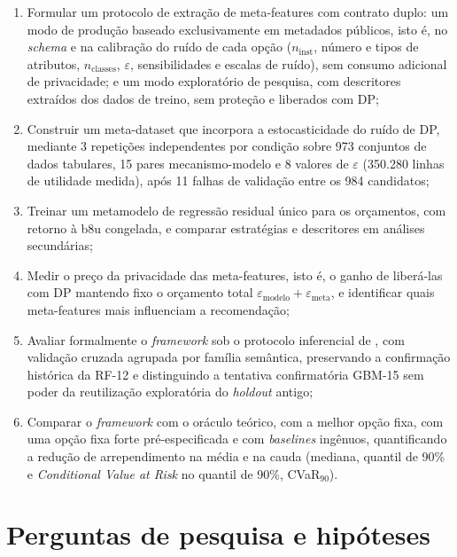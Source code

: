 \begin{enumerate}[label=\alph*)]
    \item Formular um protocolo de extração de meta-features com contrato duplo: um modo de produção baseado exclusivamente em metadados públicos, isto é, no \textit{schema} e na calibração do ruído de cada opção ($n_{\text{inst}}$, número e tipos de atributos, $n_{\text{classes}}$, $\varepsilon$, sensibilidades e escalas de ruído), sem consumo adicional de privacidade; e um modo exploratório de pesquisa, com descritores extraídos dos dados de treino, sem proteção e liberados com DP;
    \item Construir um meta-dataset que incorpora a estocasticidade do ruído de DP, mediante 3 repetições independentes por condição sobre 973 conjuntos de dados tabulares, 15 pares mecanismo-modelo e 8 valores de $\varepsilon$ (350.280 linhas de utilidade medida), após 11 falhas de validação entre os 984 candidatos;
    \item Treinar um metamodelo de regressão residual único para os orçamentos, com retorno à b8u congelada, e comparar estratégias e descritores em análises secundárias;
    \item Medir o preço da privacidade das meta-features, isto é, o ganho de liberá-las com DP mantendo fixo o orçamento total $\varepsilon_{\text{modelo}} + \varepsilon_{\text{meta}}$, e identificar quais meta-features mais influenciam a recomendação;
    \item Avaliar formalmente o \textit{framework} sob o protocolo inferencial de , com validação cruzada agrupada por família semântica, preservando a confirmação histórica da RF-12 e distinguindo a tentativa confirmatória GBM-15 sem poder da reutilização exploratória do \textit{holdout} antigo;
    \item Comparar o \textit{framework} com o oráculo teórico, com a melhor opção fixa, com uma opção fixa forte pré-especificada e com \textit{baselines} ingênuos, quantificando a redução de arrependimento na média e na cauda (mediana, quantil de 90\% e \textit{Conditional Value at Risk} no quantil de 90\%, CVaR$_{90}$).
\end{enumerate}

\section{Perguntas de pesquisa e hipóteses}
\label{sec:perguntas-pesquisa}

